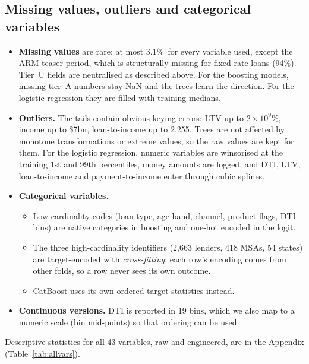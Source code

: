 \documentclass[11pt,a4paper]{article}
\newcommand{\pct}{\%}
\begin{document}
\subsection{Missing values, outliers and categorical variables}
\begin{itemize}
  \item \textbf{Missing values} are rare: at most 3.1\pct\ for every variable used, except the
  ARM teaser period, which is structurally missing for fixed-rate loans (94\pct). Tier~U
  fields are neutralised as described above. For the boosting models, missing tier~A
  numbers stay NaN and the trees learn the direction. For the logistic regression they are
  filled with training medians.
  \item \textbf{Outliers.} The tails contain obvious keying errors: LTV up to $2\times10^{9}$\pct,
  income up to \$7bn, loan-to-income up to 2{,}255. Trees are not affected by monotone
  transformations or extreme values, so the raw values are kept for them. For the
  logistic regression, numeric variables are winsorised at the training 1st and 99th
  percentiles, money amounts are logged, and DTI, LTV, loan-to-income and payment-to-income
  enter through cubic splines.
  \item \textbf{Categorical variables.}
  \begin{itemize}
    \item Low-cardinality codes (loan type, age band, channel, product flags, DTI bins) are
    native categories in boosting and one-hot encoded in the logit.
    \item The three high-cardinality identifiers (2{,}663 lenders, 418 MSAs, 54 states) are
    target-encoded with \emph{cross-fitting}: each row's encoding comes from other folds, so
    a row never sees its own outcome.
    \item CatBoost uses its own ordered target statistics instead.
  \end{itemize}
  \item \textbf{Continuous versions.} DTI is reported in 19 bins, which we also map to a
  numeric scale (bin mid-points) so that ordering can be used.
\end{itemize}
Descriptive statistics for all 43 variables, raw and engineered, are in the Appendix
(Table~\ref{tab:allvars}).
\end{document}
